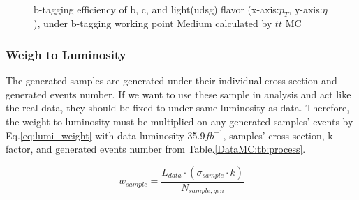 			\begin{figure}[H]
			\centering
			    \\
			   \caption{b-tagging efficiency of b, c, and light(udsg) flavor (x-axis:$p_T$, y-axis:$\eta$), under b-tagging working point Medium calculated by $t\bar{t}$ MC}
			\label{DataMC:fig:tt_eff_btag}
			\end{figure}
			\FloatBarrier

		\subsubsection{Weigh to Luminosity}
		\label{sssec:DataAndMC_lumi}

			The generated samples are generated under their individual cross section and generated events number. If we want to use these sample in analysis and act like the real data, they should be fixed to under same luminosity as data. Therefore, the weight to luminosity must be multiplied on any generated samples' events by Eq.\ref{eq:lumi_weight} with data luminosity 35.9$fb^{-1}$, samples' cross section, k factor, and generated events number from Table.\ref{DataMC:tb:process}.

			\begin{equation}
			w_{sample} = \frac{ L_{data} \cdot (\sigma_{sample} \cdot k)}{N_{sample,gen}}
			\label{eq:lumi_weight}
			\end{equation}






\FloatBarrier
